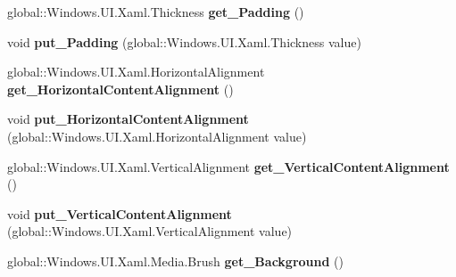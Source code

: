 \begin{DoxyCompactItemize}
\item 
\mbox{\label{interface_windows_1_1_u_i_1_1_xaml_1_1_controls_1_1_i_control_a452993e07931c19d328c465e2fbf9c1b}} 
global\+::\+Windows.\+U\+I.\+Xaml.\+Thickness {\bfseries get\+\_\+\+Padding} ()
\item 
\mbox{\label{interface_windows_1_1_u_i_1_1_xaml_1_1_controls_1_1_i_control_a0cb6fa986bebae13f4ec72989952a80f}} 
void {\bfseries put\+\_\+\+Padding} (global\+::\+Windows.\+U\+I.\+Xaml.\+Thickness value)
\item 
\mbox{\label{interface_windows_1_1_u_i_1_1_xaml_1_1_controls_1_1_i_control_ab7063d3439567f73075e2c9561509b3a}} 
global\+::\+Windows.\+U\+I.\+Xaml.\+Horizontal\+Alignment {\bfseries get\+\_\+\+Horizontal\+Content\+Alignment} ()
\item 
\mbox{\label{interface_windows_1_1_u_i_1_1_xaml_1_1_controls_1_1_i_control_aa4cc459384bbe6c700e3a0f0b23f633e}} 
void {\bfseries put\+\_\+\+Horizontal\+Content\+Alignment} (global\+::\+Windows.\+U\+I.\+Xaml.\+Horizontal\+Alignment value)
\item 
\mbox{\label{interface_windows_1_1_u_i_1_1_xaml_1_1_controls_1_1_i_control_ae586ce721d361940da51fcefd32816c7}} 
global\+::\+Windows.\+U\+I.\+Xaml.\+Vertical\+Alignment {\bfseries get\+\_\+\+Vertical\+Content\+Alignment} ()
\item 
\mbox{\label{interface_windows_1_1_u_i_1_1_xaml_1_1_controls_1_1_i_control_a44b19573be16bc17ab68814c38bc6981}} 
void {\bfseries put\+\_\+\+Vertical\+Content\+Alignment} (global\+::\+Windows.\+U\+I.\+Xaml.\+Vertical\+Alignment value)
\item 
\mbox{\label{interface_windows_1_1_u_i_1_1_xaml_1_1_controls_1_1_i_control_aac29873ebb350b3b04070ed6664351eb}} 
global\+::\+Windows.\+U\+I.\+Xaml.\+Media.\+Brush {\bfseries get\+\_\+\+Background} ()

\end{DoxyCompactItemize}
